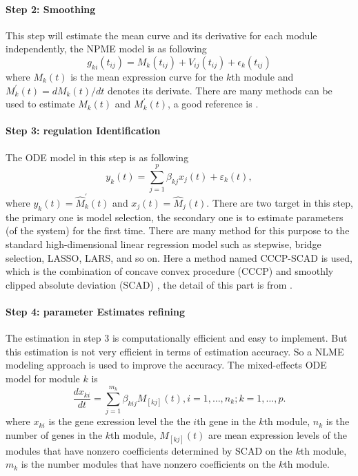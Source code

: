 \documentclass[12pt]{extarticle}
\begin{document}
\paragraph{Step 2: Smoothing}
This step will estimate the mean curve and its derivative for each module independently, the NPME model is as following \cite{Wu02}
\begin{equation}
g_{ki}(t_{ij})=M_{k}(t_{ij})+V_{ij}(t_{ij})+\epsilon_{k}(t_{ij})
\end{equation}
where $M_{k}(t)$ is the mean expression curve for the $k$th module and $M_{k}^{'}(t)=dM_{k}(t)/dt$ denotes its derivate. There are many methods can be used to estimate $M_{k}(t)$ and $M_{k}^{'}(t)$, a good reference is \cite{Wu06}.
\paragraph{Step 3: regulation Identification}
The ODE model in this step is as following
\begin{equation}
y_{k}(t)=\sum_{j=1}^{p}\beta_{kj}x_{j}(t)+\varepsilon_{k}(t),
\end{equation}
where $y_{k}(t)=\hat{M}_{k}^{'}(t)$ and $x_{j}(t)=\hat{M}_{j}(t)$.
There are two target in this step, the primary one is model selection, the secondary one is to estimate parameters (of the system) for the first time. There are many method for this purpose to the standard high-dimensional linear regression model such as stepwise, bridge selection, LASSO, LARS, and so on. Here a method named CCCP-SCAD is used, which is the combination of concave convex procedure (CCCP) \cite{Le97} and smoothly clipped absolute deviation (SCAD) \cite{Fan01}, the detail of this part is from \cite{Kim08}.
\paragraph{Step 4: parameter Estimates refining}
The estimation in step 3 is computationally efficient and easy to implement. But this estimation is not very efficient in terms of estimation accuracy. So a NLME modeling approach is used to improve the accuracy.
The mixed-effects ODE model for module $k$ is
\begin{equation}
\frac{dx_{ki}}{dt}=\sum_{j=1}^{m_k}\beta_{kij}M_{[kj]}(t), i=1,\ldots,n_k; k=1,\ldots,p. \label{s41}
\end{equation}
where $x_{ki}$ is the gene exression level the the $i$th gene in the $k$th module, $n_k$ is the number of genes in the $k$th module, $M_{[kj]}(t)$ are mean expression levels of the modules that have nonzero coefficients determined by SCAD on the $k$th module, $m_k$ is the number modules that have nonzero coefficients on the $k$th module.
\end{document}
